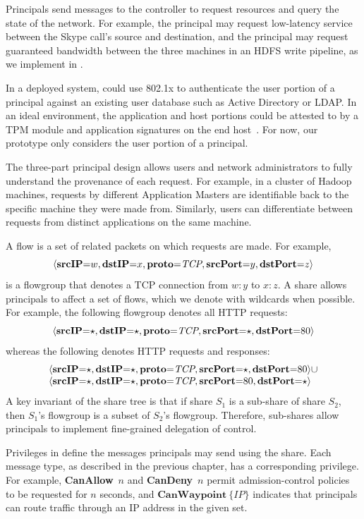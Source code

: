 Principals send messages to the \sys controller to request resources
and query the state of the network. For example, the principal
 may request low-latency service
between the Skype call's source and destination, and the principal
 may request guaranteed bandwidth
between the three machines in an HDFS write pipeline, as we implement
in .

In a deployed system, \sys could use 802.1x to authenticate the user
portion of a principal against an existing user database such as
Active Directory or LDAP. In an ideal environment, the application and
host portions could be attested to by a TPM module and application
signatures on the end host~\cite{Nexus}.  For now, our prototype only
considers the user portion of a principal.

The three-part principal design allows users and network
administrators to fully understand the provenance of each request. For
example, in a cluster of Hadoop machines, requests by different
Application Masters are identifiable back to the specific machine they
were made from. Similarly, users can differentiate between requests from
distinct applications on the same machine.

\label{sec:Flowgroups}
A flow is a set of related packets on which requests are
made. For example,
\[
\langle\textbf{srcIP}\mathord{=}w,\textbf{dstIP}\mathord{=}x,\textbf{proto}\mathord{=}\textit{TCP},\textbf{srcPort}\mathord{=}y,\textbf{dstPort}\mathord{=}z\rangle
\]
is a flowgroup that denotes a TCP connection from $w:y$ to $x:z$. A
\sys share allows principals to affect a set of flows, which we denote
with wildcards when possible. For example, the following flowgroup
denotes all HTTP requests:
\[ 
  \langle\textbf{srcIP}\mathord{=}\star,\textbf{dstIP}\mathord{=}\star,\textbf{proto}\mathord{=}\textit{TCP},\textbf{srcPort}\mathord{=}\star,\textbf{dstPort}\mathord{=}80\rangle 
\]
whereas the following denotes HTTP requests and responses:
\[
  \begin{array}{l@{}l}
  \paneshare{\star}{\star}{\textit{TCP}}{\star}{80} & \cup \\
  \paneshare{\star}{\star}{\textit{TCP}}{80}{\star}
  \end{array}
\]
A key invariant of the share tree is that if share $S_1$ is a
sub-share of share $S_2$, then $S_1$'s flowgroup is a subset of $S_2$'s
flowgroup. Therefore, sub-shares allow principals to implement
fine-grained delegation of control.

%
Privileges in \sys define the messages principals may send using the share.
Each message type, as described in the previous chapter, has a corresponding
privilege. For example,
\textbf{CanAllow}~$n$ and \textbf{CanDeny}~$n$ permit
admission-control policies to be requested for $n$ seconds, and $\textbf{CanWaypoint}~\{\textit{IP}\}$
indicates that principals can route traffic through an IP address in the given set.

